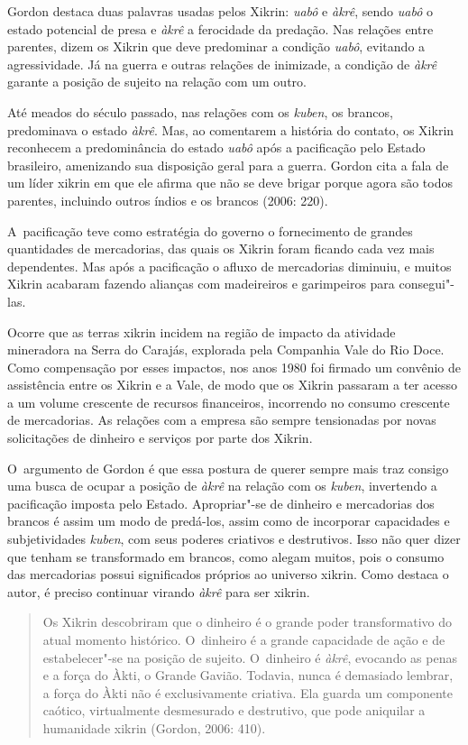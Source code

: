 Gordon destaca duas palavras usadas pelos Xikrin: \emph{uabô} e \emph{àkrê}, sendo
\emph{uabô} o estado potencial de presa e \emph{àkrê} a ferocidade da predação. Nas
relações entre parentes, dizem os Xikrin que deve predominar a condição
\emph{uabô}, evitando a agressividade. Já na guerra e outras relações de
inimizade, a condição de \emph{àkrê} garante a posição de sujeito na relação
com um outro. 

Até meados do século passado, nas relações com os \emph{kuben}, os brancos,
predominava o estado \emph{àkrê}. Mas, ao comentarem a história do contato, os
Xikrin reconhecem a predominância do estado \emph{uabô} após a pacificação
pelo Estado brasileiro, amenizando sua disposição geral para a guerra.
Gordon cita a fala de um líder xikrin em que ele afirma que não se deve
brigar porque agora são todos parentes, incluindo outros índios e os
brancos (2006: 220). 

A~pacificação teve como estratégia do governo o fornecimento de grandes
quantidades de mercadorias, das quais os Xikrin foram ficando cada vez
mais dependentes. Mas após a pacificação o afluxo de mercadorias
diminuiu, e muitos Xikrin acabaram fazendo alianças com madeireiros e
garimpeiros para consegui"-las. 

Ocorre que as terras xikrin incidem na região de impacto da atividade
mineradora na Serra do Carajás, explorada pela Companhia Vale do Rio
Doce. Como compensação por esses impactos, nos anos 1980 foi firmado um
convênio de assistência entre os Xikrin e a Vale, de modo que os Xikrin
passaram a ter acesso a um volume crescente de recursos financeiros,
incorrendo no consumo crescente de mercadorias. As relações com a
empresa são sempre tensionadas por novas solicitações de dinheiro e
serviços por parte dos Xikrin. 

O~argumento de Gordon é que essa postura de querer sempre mais traz
consigo uma busca de ocupar a posição de \emph{àkrê} na relação com os \emph{kuben},
invertendo a pacificação imposta pelo Estado. Apropriar"-se de dinheiro
e mercadorias dos brancos é assim um modo de predá-los, assim como de
incorporar capacidades e subjetividades \emph{kuben}, com seus poderes
criativos e destrutivos. Isso não quer dizer que tenham se transformado
em brancos, como alegam muitos, pois o consumo das mercadorias possui
significados próprios ao universo xikrin. Como destaca o autor, é
preciso continuar virando \emph{àkrê} para ser xikrin.

\begin{quote}
Os Xikrin descobriram que o dinheiro é o grande poder transformativo do
atual momento histórico. O~dinheiro é a grande capacidade de ação e de
estabelecer"-se na posição de sujeito. O~dinheiro é \emph{àkrê}, evocando as
penas e a força do Àkti, o Grande Gavião. Todavia, nunca é demasiado
lembrar, a força do Àkti não é exclusivamente criativa. Ela guarda um
componente caótico, virtualmente desmesurado e destrutivo, que pode
aniquilar a humanidade xikrin (Gordon, 2006: 410).
\end{quote}

